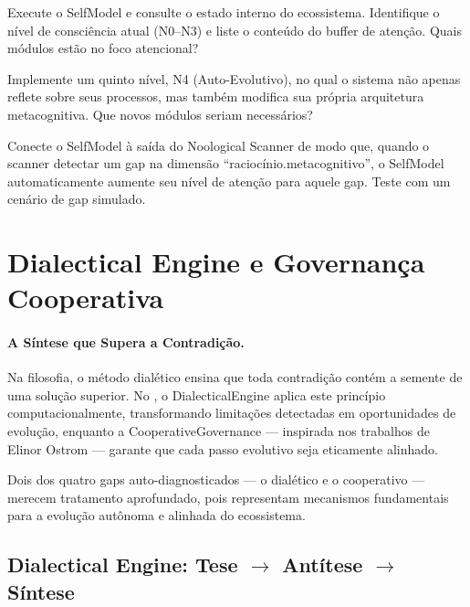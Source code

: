 \begin{exercicio}
Execute o SelfModel e consulte o estado interno do ecossistema. Identifique
o nível de consciência atual (N0--N3) e liste o conteúdo do buffer de
atenção. Quais módulos estão no foco atencional?
\end{exercicio}

\begin{exercicio}
Implemente um quinto nível, N4 (Auto-Evolutivo), no qual o sistema não
apenas reflete sobre seus processos, mas também modifica sua própria
arquitetura metacognitiva. Que novos módulos seriam necessários?
\end{exercicio}

\begin{exercicio}
Conecte o SelfModel à saída do Noological Scanner de modo que, quando o
scanner detectar um gap na dimensão ``raciocínio.metacognitivo'', o
SelfModel automaticamente aumente seu nível de atenção para aquele gap.
Teste com um cenário de gap simulado.
\end{exercicio}

\section{Dialectical Engine e Governança Cooperativa}
\label{sec:dialectical-governanca}
\nivelphd

\paragraph{A Síntese que Supera a Contradição.} Na filosofia, o método dialético ensina que toda contradição contém a semente de uma solução superior. No \opencodeeco{}, o DialecticalEngine aplica este princípio computacionalmente, transformando limitações detectadas em oportunidades de evolução, enquanto a CooperativeGovernance --- inspirada nos trabalhos de Elinor Ostrom --- garante que cada passo evolutivo seja eticamente alinhado.

Dois dos quatro gaps auto-diagnosticados --- o dialético e o cooperativo
--- merecem tratamento aprofundado, pois representam mecanismos
fundamentais para a evolução autônoma e alinhada do ecossistema.

\subsection{Dialectical Engine: Tese $\rightarrow$ Antítese $\rightarrow$ Síntese}

